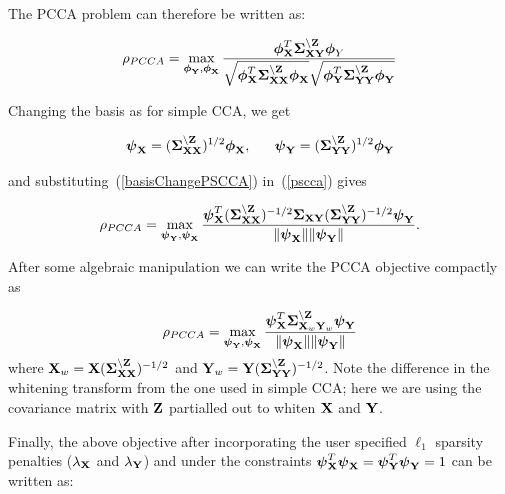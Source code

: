 \documentclass{llncs}
\newcommand{\X}{{\bf X}}
\newcommand{\Y}{{\bf Y}}
\newcommand{\Z}{{\bf Z}}
\newcommand{\bs}{\boldsymbol}
\begin{document}


The PCCA problem can therefore be written as:

\begin{equation}
\label{pscca}
\rho_{PCCA}=\max_{{\bs\phi_{\Y}}, {\bs\phi_{\X}}} \frac{\bs\phi_{\X}^T \bs\Sigma_{\X\Y}^{\backslash \Z}\bs\phi_Y}{\sqrt{\bs\phi_{\X}^T\bs\Sigma_{\X\X}^{\backslash \Z}\bs\phi_{\X}}\sqrt{\bs\phi_{\Y}^T\bs\Sigma_{\Y\Y}^{\backslash \Z}\bs\phi_{\Y}}}
\end{equation}


Changing the basis as for simple CCA, we get

\begin{equation}
\label{basisChangePSCCA}
\bs\psi_{\X} = (\bs\Sigma_{\X\X}^{\backslash \Z})^{1/2}\bs\phi_{\X}, \;\;\;\;\;\;   \bs\psi_{\Y} = (\bs\Sigma_{\Y\Y}^{\backslash \Z})^{1/2}\bs\phi_{\Y} 
\end{equation}

and substituting~(\ref{basisChangePSCCA}) in~(\ref{pscca}) gives

\begin{equation}
\label{subsPSCCA}
\rho_{PCCA}= \max_{{\bs\psi_{\Y}}, {\bs\psi_{\X}}} \frac{\bs\psi_{\X}^T (\bs\Sigma_{\X\X}^{\backslash \Z})^{-1/2}\bs\Sigma_{\X\Y}(\bs\Sigma_{\Y\Y}^{\backslash \Z})^{-1/2}\bs\psi_{\Y}}{\|\bs\psi_{\X}\| \|\bs\psi_{\Y}\|} .
\end{equation}

After some algebraic manipulation we can write the PCCA objective compactly as

\begin{equation}
\label{psccacompact}
\rho_{PCCA}=\max_{{\bs\psi_{\Y}}, {\bs\psi_{\X}}} \frac{\bs\psi_{\X}^T \bs\Sigma_{\X_w\Y_w}^{\backslash \Z}\bs\psi_{\Y}}{\|\bs\psi_{\X}\| \|\bs\psi_{\Y}\|}
\end{equation}
where $\X_w=\X(\bs\Sigma_{\X\X}^{\backslash \Z})^{-1/2}$ and
$\Y_w=\Y(\bs\Sigma_{\Y\Y}^{\backslash \Z})^{-1/2}$. Note the
difference in the whitening transform from the one used in simple CCA;
here we are using the covariance matrix with $\Z$ partialled out
to whiten $\X$ and $\Y$.


Finally, the above objective after incorporating the user specified $\ell_1$ sparsity penalties ($\lambda_{\X}$ and $\lambda_{\Y}$) and under the constraints $\bs\psi_{\X}^T\bs\psi_{\X}=\bs\psi_{\Y}^T\bs\psi_{\Y}=1$ can be written as:
\end{document}
